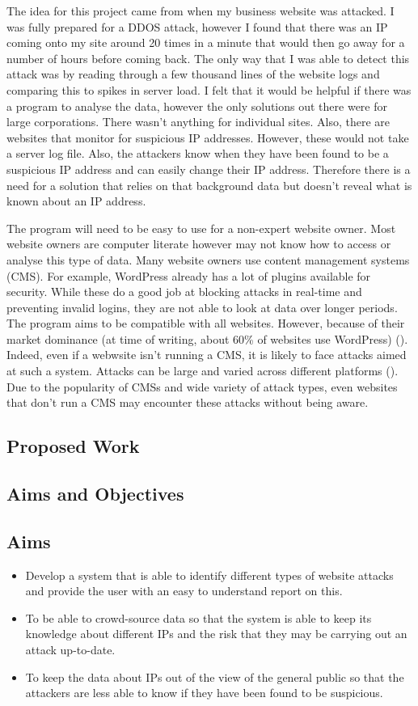 The idea for this project came from when my business website was attacked. I was fully prepared for a DDOS attack, however I found that there was an IP coming onto my site around 20 times in a minute that would then go away for a number of hours before coming back. The only way that I was able to detect this attack was by reading through a few thousand lines of the website logs and comparing this to spikes in server load. I felt that it would be helpful if there was a program to analyse the data, however the only solutions out there were for large corporations. There wasn't anything for individual sites. Also, there are websites that monitor for suspicious IP addresses. However, these would not take a server log file. Also, the attackers know when they have been found to be a suspicious IP address and can easily change their IP address. Therefore there is a need for a solution that relies on that background data but doesn't reveal what is known about an IP address.

The program will need to be easy to use for a non-expert website owner. Most website owners are computer literate however may not know how to access or analyse this type of data. Many website owners use content management systems (CMS). For example, WordPress already has a lot of plugins available for security. While these do a good job at blocking attacks in real-time and preventing invalid logins, they are not able to look at data over longer periods. The program aims to be compatible with all websites. However, because of their market dominance (at time of writing, about 60\% of websites use WordPress)  (\cite{IsItWP}). Indeed, even if a webwsite isn't running a CMS, it is likely to face attacks aimed at such a system. Attacks can be large and varied across different platforms (\cite{patel2013comparative}). Due to the popularity of CMSs and wide variety of attack types, even websites that don't run a CMS may encounter these attacks without being aware.
\subsection*{Proposed Work}
\label{proposed}


\subsection*{Aims and Objectives}
\subsection*{Aims}
\begin{itemize}
    \item Develop a system that is able to identify different types of website attacks and provide the user with an easy to understand report on this.
    \item To be able to crowd-source data so that the system is able to keep its knowledge about different IPs and the risk that they may be carrying out an attack up-to-date.
    \item To keep the data about IPs out of the view of the general public so that the attackers are less able to know if they have been found to be suspicious.
\end{itemize}


